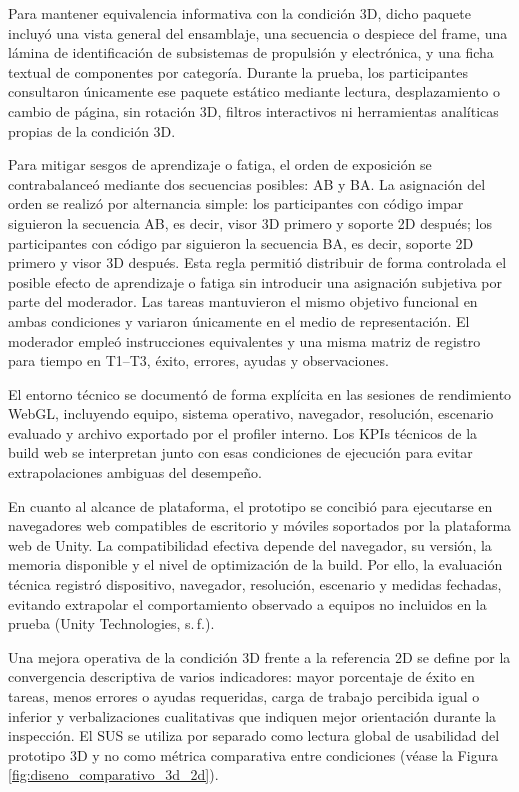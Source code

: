Para mantener equivalencia informativa con la condición 3D, dicho paquete incluyó una vista general del ensamblaje, una secuencia o despiece del frame, una lámina de identificación de subsistemas de propulsión y electrónica, y una ficha textual de componentes por categoría. Durante la prueba, los participantes consultaron únicamente ese paquete estático mediante lectura, desplazamiento o cambio de página, sin rotación 3D, filtros interactivos ni herramientas analíticas propias de la condición 3D.

Para mitigar sesgos de aprendizaje o fatiga, el orden de exposición se contrabalanceó mediante dos secuencias posibles: AB y BA. La asignación del orden se realizó por alternancia simple: los participantes con código impar siguieron la secuencia AB, es decir, visor 3D primero y soporte 2D después; los participantes con código par siguieron la secuencia BA, es decir, soporte 2D primero y visor 3D después. Esta regla permitió distribuir de forma controlada el posible efecto de aprendizaje o fatiga sin introducir una asignación subjetiva por parte del moderador. Las tareas mantuvieron el mismo objetivo funcional en ambas condiciones y variaron únicamente en el medio de representación. El moderador empleó instrucciones equivalentes y una misma matriz de registro para tiempo en T1--T3, éxito, errores, ayudas y observaciones.

El entorno técnico se documentó de forma explícita en las sesiones de rendimiento WebGL, incluyendo equipo, sistema operativo, navegador, resolución, escenario evaluado y archivo exportado por el profiler interno. Los KPIs técnicos de la build web se interpretan junto con esas condiciones de ejecución para evitar extrapolaciones ambiguas del desempeño.

En cuanto al alcance de plataforma, el prototipo se concibió para ejecutarse en navegadores web compatibles de escritorio y móviles soportados por la plataforma web de Unity. La compatibilidad efectiva depende del navegador, su versión, la memoria disponible y el nivel de optimización de la build. Por ello, la evaluación técnica registró dispositivo, navegador, resolución, escenario y medidas fechadas, evitando extrapolar el comportamiento observado a equipos no incluidos en la prueba (Unity Technologies, s.\,f.).

Una mejora operativa de la condición 3D frente a la referencia 2D se define por la convergencia descriptiva de varios indicadores: mayor porcentaje de éxito en tareas, menos errores o ayudas requeridas, carga de trabajo percibida igual o inferior y verbalizaciones cualitativas que indiquen mejor orientación durante la inspección. El SUS se utiliza por separado como lectura global de usabilidad del prototipo 3D y no como métrica comparativa entre condiciones (véase la Figura \ref{fig:diseno_comparativo_3d_2d}).

